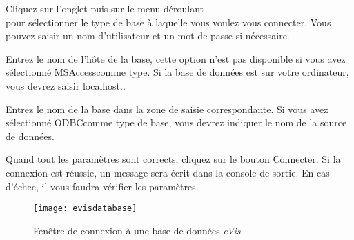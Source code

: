 \label{evis_connect_database}


Cliquez sur l'onglet  puis sur le menu déroulant\\  pour sélectionner le type de base à laquelle vous voulez vous connecter. Vous pouvez saisir un nom d'utilisateur et un mot de passe si nécessaire.


Entrez le nom de l'hôte de la base, cette option n'est pas disponible si vous avez sélectionné \og MSAccess\fg  comme type. Si la base de données est sur votre ordinateur, vous devrez saisir \og localhost.\fg .


Entrez le nom de la base dans la zone de saisie correspondante. Si vous avez sélectionné \og ODBC\fg  comme type de base, vous devrez indiquer le nom de la source de données.


Quand tout les paramètres sont corrects, cliquez sur le bouton Connecter. Si la connexion est réussie, un message sera écrit dans la console de sortie. En cas d'échec, il vous faudra vérifier les paramètres.

\begin{figure}[ht]
   \begin{center}
\texttt{[image: evisdatabase]}
\caption{Fenêtre de connexion à une base de données \emph{eVis} \nixcaption}\label{evisdatabase}
\end{center}
\end{figure}

